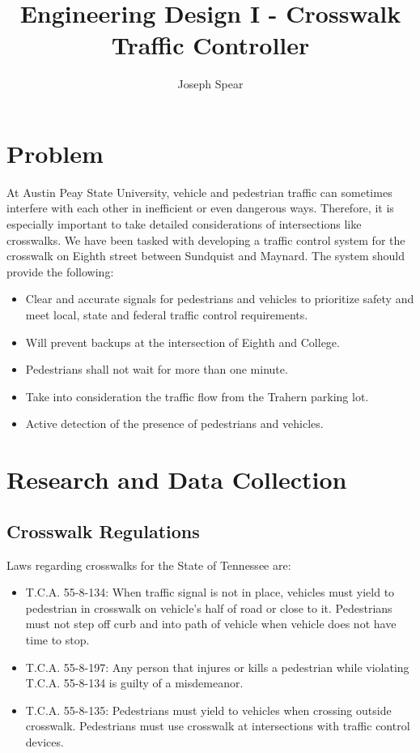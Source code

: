 \documentclass{article}
\begin{document}
\title{Engineering Design I - Crosswalk Traffic Controller}
\author{Joseph Spear}

\maketitle


\section{Problem}
At Austin Peay State University, vehicle and pedestrian traffic can sometimes interfere with each other in inefficient or even dangerous ways. Therefore, it is especially important to take detailed considerations of intersections like crosswalks. We have been tasked with developing a traffic control system for the crosswalk on Eighth street between Sundquist and Maynard. The system should provide the following:

\begin{itemize}
\item{Clear and accurate signals for pedestrians and vehicles to prioritize safety and meet local, state and federal traffic control requirements.}
\item{Will prevent backups at the intersection of Eighth and College.}
\item{Pedestrians shall not wait for more than one minute.}
\item{Take into consideration the traffic flow from the Trahern parking lot.}
\item{Active detection of the presence of pedestrians and vehicles.}
\end{itemize}



\section{Research and Data Collection}
\subsection{Crosswalk Regulations}
Laws regarding crosswalks for the State of Tennessee are:

\begin{itemize}
\item T.C.A.  55-8-134: When traffic signal is not in place, vehicles must yield to pedestrian in crosswalk on vehicle’s half of road or close to it. Pedestrians must not step off curb and into path of vehicle when vehicle does not have time to stop.

\item T.C.A.  55-8-197: Any person that injures or kills a pedestrian while violating T.C.A. 55-8-134 is guilty of a misdemeanor.

\item T.C.A.  55-8-135: Pedestrians must yield to vehicles when crossing outside crosswalk. Pedestrians must use crosswalk at intersections with traffic control devices.

\end{itemize}
\end{document}
